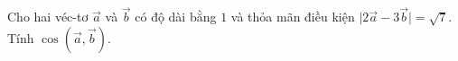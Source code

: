 \begin{bt}
	Cho hai véc-tơ $ \overrightarrow{a} $ và $ \overrightarrow{b} $ có độ dài bằng $ 1 $ và thỏa mãn điều kiện $ \big | 2\overrightarrow{a}-3\overrightarrow{b} \big |=\sqrt{7} $. Tính $ \cos \left (\overrightarrow{a},\overrightarrow{b}\right ) $.%
\end{bt}

